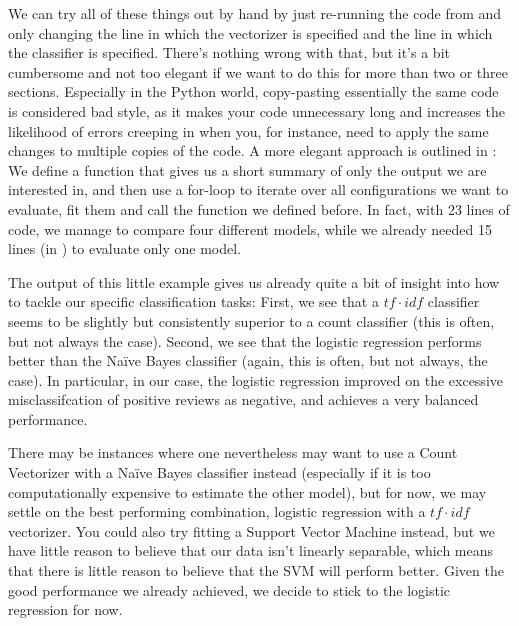 We can try all of these things out by hand by just re-running the code
from  and only changing the line in which the
vectorizer is specified and the line in which the classifier is
specified. There's nothing wrong with that, but it's a bit cumbersome
and not too elegant if we want to do this for more than two or three
sections. Especially in the Python world, copy-pasting essentially the
same code is considered bad style, as it makes your code unnecessary
long and increases the likelihood of errors creeping in when you, for
instance, need to apply the same changes to multiple copies of the
code.  A more elegant approach is outlined in
: We define a function that gives us a short
summary of only the output we are interested in, and then use a
for-loop to iterate over all configurations we want to evaluate, fit
them and call the function we defined before. In fact, with 23 lines
of code, we manage to compare four different models, while we already
needed 15 lines (in ) to evaluate only one model.




The output of this little example gives us already quite a bit of
insight into how to tackle our specific classification tasks: First, we
see that a $tf\cdot idf$ classifier seems to be slightly but
consistently superior to a count classifier (this is often, but not
always the case). Second, we see that the logistic regression performs
better than the Na\"ive Bayes classifier (again, this is often, but not
always, the case). In particular, in our case, the logistic regression
improved on the excessive misclassifcation of positive reviews as
negative, and achieves a very balanced performance.

There may be instances where one nevertheless may want to use a Count
Vectorizer with a Na\"ive Bayes classifier instead (especially if it
is too computationally expensive to estimate the other model), but for
now, we may settle on the best performing combination, logistic
regression with a $tf\cdot idf$ vectorizer. You could also try fitting
a Support Vector Machine instead, but we have little reason to believe
that our data isn't linearly separable, which means that there is
little reason to believe that the SVM will perform better. Given the
good performance we already achieved, we decide to stick to the
logistic regression for now.


